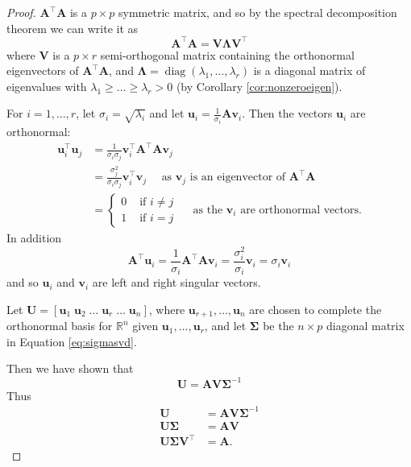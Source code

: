 \documentclass[
]{book}
\theoremstyle{definition}
\theoremstyle{definition}
\theoremstyle{definition}
\theoremstyle{definition}
\theoremstyle{remark}
\begin{document}
\begin{proof}
\(\mathbf A^\top \mathbf A\) is a \(p\times p\) symmetric matrix, and so by the spectral decomposition theorem we can write it as \[\mathbf A^\top \mathbf A= \mathbf V\boldsymbol \Lambda\mathbf V^\top\]
where \(\mathbf V\) is a \(p \times r\) semi-orthogonal matrix containing the orthonormal eigenvectors of \(\mathbf A^\top \mathbf A\), and \(\boldsymbol \Lambda=\operatorname{diag}(\lambda_1, \ldots, \lambda_r)\) is a diagonal matrix of eigenvalues with \(\lambda_1\geq \ldots \geq\lambda_r>0\) (by Corollary \ref{cor:nonzeroeigen}).

For \(i=1,\dots, r\), let \(\sigma_i =\sqrt{\lambda_i}\) and let \(\mathbf u_i = \frac{1}{\sigma_i} \mathbf A\mathbf v_i\). Then the vectors \(\mathbf u_i\) are orthonormal:
\begin{align*}
\mathbf u_i^\top \mathbf u_j &=\frac{1}{\sigma_i\sigma_j} \mathbf v_i^\top \mathbf A^\top\mathbf A\mathbf v_j\\
&=\frac{\sigma_j^2}{\sigma_i\sigma_j} \mathbf v_i^\top\mathbf v_j \quad \mbox{ as }\mathbf v_j \mbox{ is an eigenvector of } \mathbf A^\top\mathbf A\\
&=\begin{cases}
0 &\mbox{ if } i\not=j\\
1 &\mbox{ if } i=j
\end{cases}\quad \mbox{ as the } \mathbf v_i \mbox{ are orthonormal vectors.}
\end{align*}
In addition
\[\mathbf A^\top\mathbf u_i = \frac{1}{\sigma_i}\mathbf A^\top\mathbf A\mathbf v_i = \frac{\sigma^2_i}{\sigma_i}\mathbf v_i = \sigma_i\mathbf v_i\]
and so \(\mathbf u_i\) and \(\mathbf v_i\) are left and right singular vectors.

Let \(\mathbf U=[\mathbf u_1 \; \mathbf u_2 \; \ldots \; \mathbf u_r\; \ldots \; \mathbf u_n]\), where \(\mathbf u_{r+1}, \ldots, \mathbf u_n\) are chosen to complete the orthonormal basis for \(\mathbb{R}^n\) given \(\mathbf u_1,   \ldots, \mathbf u_r\), and
let \(\boldsymbol{\Sigma}\) be the \(n\times p\) diagonal matrix in Equation \eqref{eq:sigmasvd}.

Then we have shown that
\[\mathbf U= \mathbf A\mathbf V\boldsymbol{\Sigma}^{-1}\]
Thus
\begin{align*}
\mathbf U&= \mathbf A\mathbf V\boldsymbol{\Sigma}^{-1}\\
\mathbf U\boldsymbol{\Sigma}&= \mathbf A\mathbf V\\
\mathbf U\boldsymbol{\Sigma}\mathbf V^\top &= \mathbf A.
\end{align*}
\end{proof}
\end{document}
